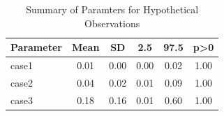 \documentclass[
]{article}
\begin{document}
\begin{table}[h]

\begin{center}
\begin{threeparttable}

\caption{\label{tab:unnamed-chunk-9}Summary of Paramters for Hypothetical Observations}

\begin{tabular}{lccccc}
\toprule
Parameter & Mean & SD & 2.5 & 97.5 & p>0\\
\midrule
case1 & 0.01 & 0.00 & 0.00 & 0.02 & 1.00\\
case2 & 0.04 & 0.02 & 0.01 & 0.09 & 1.00\\
case3 & 0.18 & 0.16 & 0.01 & 0.60 & 1.00\\
\bottomrule
\end{tabular}

\end{threeparttable}
\end{center}

\end{table}
\end{document}
